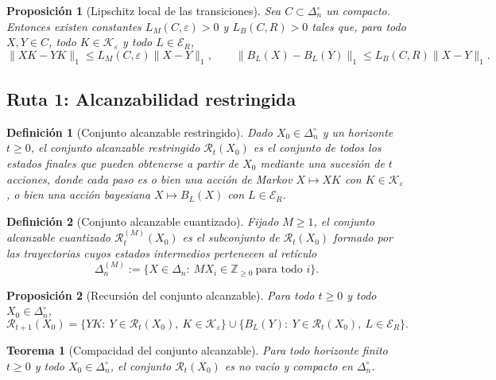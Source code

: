 \documentclass[12pt]{article}
\newtheorem{definicion}{Definición}[section]
\newtheorem{proposicion}{Proposición}[section]
\newtheorem{teorema}{Teorema}[section]
\begin{document}
\begin{proposicion}[Lipschitz local de las transiciones]\label{prop:lipschitz-transiciones}
Sea $C\subset\Delta_n^\circ$ un compacto. Entonces existen constantes
$L_M(C,\varepsilon)>0$ y $L_B(C,R)>0$ tales que, para todo $X,Y\in C$, todo
$K\in\mathcal K_\varepsilon$ y todo $L\in\mathcal E_R$,
\[
\|XK-YK\|_1\le L_M(C,\varepsilon)\|X-Y\|_1,
\qquad
\|B_L(X)-B_L(Y)\|_1\le L_B(C,R)\|X-Y\|_1.
\]
\end{proposicion}

\subsection*{Ruta 1: Alcanzabilidad restringida}

\begin{definicion}[Conjunto alcanzable restringido]
Dado $X_0\in\Delta_n^\circ$ y un horizonte $t\ge 0$, el \emph{conjunto
alcanzable restringido} $\mathcal R_t(X_0)$ es el conjunto de todos los
estados finales que pueden obtenerse a partir de $X_0$ mediante una sucesión de
$t$ acciones, donde cada paso es o bien una acción de Markov $X\mapsto XK$ con
$K\in\mathcal K_\varepsilon$, o bien una acción bayesiana $X\mapsto B_L(X)$ con
$L\in\mathcal E_R$.
\end{definicion}

\begin{definicion}[Conjunto alcanzable cuantizado]
Fijado $M\ge 1$, el \emph{conjunto alcanzable cuantizado} $\mathcal R_t^{(M)}(X_0)$
es el subconjunto de $\mathcal R_t(X_0)$ formado por las trayectorias cuyos
estados intermedios pertenecen al retículo
\[
\Delta_n^{(M)}:=\{X\in\Delta_n:\ MX_i\in\mathbb Z_{\ge 0}\ \text{para todo }i\}.
\]
\end{definicion}

\begin{proposicion}[Recursión del conjunto alcanzable]\label{prop:recursion-alcanzable}
Para todo $t\ge 0$ y todo $X_0\in\Delta_n^\circ$,
\[
\mathcal R_{t+1}(X_0)
=
\bigl\{YK:\ Y\in\mathcal R_t(X_0),\ K\in\mathcal K_\varepsilon\bigr\}
\cup
\bigl\{B_L(Y):\ Y\in\mathcal R_t(X_0),\ L\in\mathcal E_R\bigr\}.
\]
\end{proposicion}

\begin{teorema}[Compacidad del conjunto alcanzable]\label{teo:compacticidad-alcanzable}
Para todo horizonte finito $t\ge 0$ y todo $X_0\in\Delta_n^\circ$, el conjunto
$\mathcal R_t(X_0)$ es no vacío y compacto en $\Delta_n^\circ$.
\end{teorema}
\end{document}
